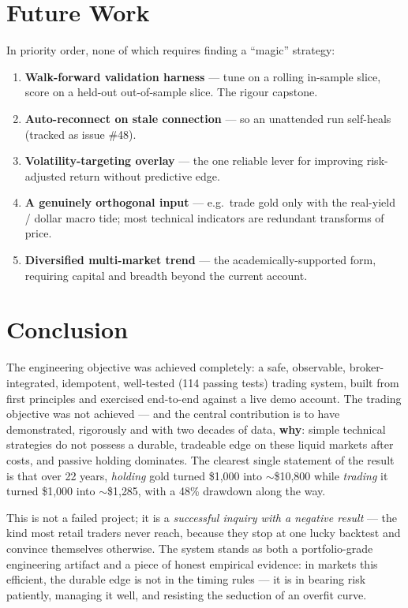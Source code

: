 \documentclass[11pt,a4paper]{article}
\begin{document}
\section{Future Work}
In priority order, none of which requires finding a ``magic'' strategy:
\begin{enumerate}[leftmargin=1.6em]
  \item \textbf{Walk-forward validation harness} --- tune on a rolling in-sample slice, score on a held-out out-of-sample slice. The rigour capstone.
  \item \textbf{Auto-reconnect on stale connection} --- so an unattended run self-heals (tracked as issue \#48).
  \item \textbf{Volatility-targeting overlay} --- the one reliable lever for improving risk-adjusted return without predictive edge.
  \item \textbf{A genuinely orthogonal input} --- e.g.\ trade gold only with the real-yield / dollar macro tide; most technical indicators are redundant transforms of price.
  \item \textbf{Diversified multi-market trend} --- the academically-supported form, requiring capital and breadth beyond the current account.
\end{enumerate}

\section{Conclusion}
The engineering objective was achieved completely: a safe, observable, broker-integrated, idempotent, well-tested (114 passing tests) trading system, built from first principles and exercised end-to-end against a live demo account. The trading objective was not achieved --- and the central contribution is to have demonstrated, rigorously and with two decades of data, \textbf{why}: simple technical strategies do not possess a durable, tradeable edge on these liquid markets after costs, and passive holding dominates. The clearest single statement of the result is that over 22 years, \emph{holding} gold turned \$1{,}000 into $\sim$\$10{,}800 while \emph{trading} it turned \$1{,}000 into $\sim$\$1{,}285, with a 48\% drawdown along the way.

This is not a failed project; it is a \emph{successful inquiry with a negative result} --- the kind most retail traders never reach, because they stop at one lucky backtest and convince themselves otherwise. The system stands as both a portfolio-grade engineering artifact and a piece of honest empirical evidence: in markets this efficient, the durable edge is not in the timing rules --- it is in bearing risk patiently, managing it well, and resisting the seduction of an overfit curve.
\end{document}
